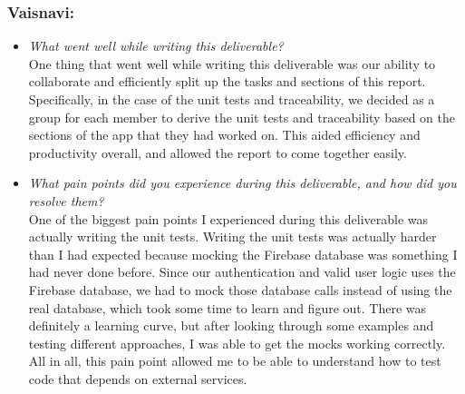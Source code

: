 \documentclass[12pt, titlepage]{article}
\begin{document}
\subsubsection*{Vaisnavi:}
\begin{itemize}
  \item \textit{What went well while writing this deliverable?} \\

    One thing that went well while writing this deliverable was our ability to collaborate 
    and efficiently split up the tasks and sections of this report. Specifically, in the case of 
    the unit tests and traceability, we decided as a group for each member to derive the unit tests and 
    traceability based on the sections of the app that they had worked on. This aided efficiency and productivity 
    overall, and allowed the report to come together easily.

  \item \textit{What pain points did you experience during this
    deliverable, and how did you resolve them?}\\

    One of the biggest pain points I experienced during this deliverable was actually writing the unit tests. 
    Writing the unit tests was actually harder than I had expected because mocking the Firebase database was something I had 
    never done before. Since our authentication and valid user logic uses the Firebase database, we had to mock those 
    database calls instead of using the real database, which took some time to learn and figure out. There was 
    definitely a learning curve, but after looking through some examples and testing different approaches, I was able to 
    get the mocks working correctly. All in all, this pain point allowed me to be able to understand how to test code 
    that depends on external services.

\end{itemize}
\end{document}
